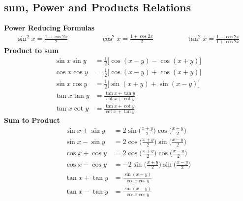 \subsection{sum, Power and Products Relations}
\textbf{Power Reducing Formulas}
\begin{align*}
  \sin^2 x  = \frac{1 - \cos 2x}{2}\hspace{2cm}
  \cos^2 x  = \frac{1 + \cos 2x}{2}\hspace{2cm}
  \tan^2 x  = \frac{1 - \cos 2x}{1 + \cos 2x}
\end{align*}
\textbf{Product to sum}
\begin{align*}
  \sin x \sin y &= \frac{1}{2}\big[\cos(x - y) - \cos(x + y)\big]\\
  \cos x \cos y &= \frac{1}{2}\big[\cos(x - y) + \cos(x + y)\big]\\
  \sin x \cos y &= \frac{1}{2}\big[\sin(x + y) + \sin(x - y)\big]\\
  \tan x \tan y &= \frac{ \tan x + \tan y }{ \cot x + \cot y }\\
  \tan x \cot y &= \frac{ \tan x + \cot y }{ \cot x + \tan y }
\end{align*}
\textbf{Sum to Product}
\begin{align*}
  \sin x + \sin y &= 2 \sin \Big( \frac{x + y}{2} \Big) \cos \Big( \frac{x - y}{2} \Big)\\
  \sin x - \sin y &= 2 \cos \Big( \frac{x + y}{2} \Big) \sin \Big( \frac{x - y}{2} \Big)\\
  \cos x + \cos y &= 2 \cos \Big( \frac{x + y}{2} \Big) \cos \Big( \frac{x - y}{2} \Big)\\
  \cos x - \cos y &= -2 \sin \Big( \frac{x + y}{2} \Big) \sin \Big( \frac{x - y}{2} \Big)\\
  \tan x + \tan y &= \frac{ \sin(x + y) }{ \cos x \cos y}\\
  \tan x - \tan y &= \frac{ \sin(x - y) }{ \cos x \cos y}\\
\end{align*}
\pagebreak

